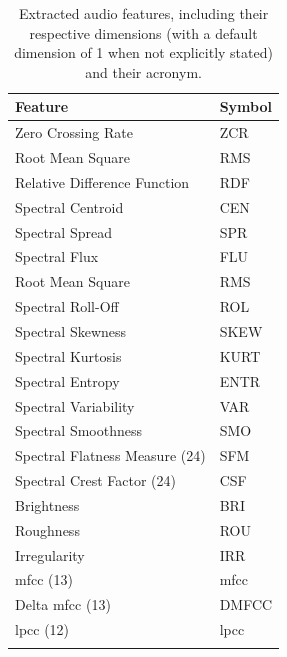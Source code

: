 \begin{table}[ht!]
    \caption[Features extracted in the BDLib2 dataset]{Extracted audio features, including their respective dimensions (with a default dimension of 1 when not explicitly stated) and their acronym.}
    \label{table:BDLib2_features_extracted}
    \centering
    \begin{tabular}{
        >{\centering\arraybackslash}m{} | >{\centering\arraybackslash}m{}}
        \Xhline{2\arrayrulewidth}
        \rowcolor{lightgray}
        \textbf{Feature} & \textbf{Symbol} \\
        \hline
        Zero Crossing Rate & ZCR \\
        \hline
        Root Mean Square & RMS \\
        \hline
        Relative Difference Function & RDF  \\
        \hline
        Spectral Centroid  & CEN \\
        \hline
        Spectral Spread & SPR\\
        \hline
        Spectral Flux & FLU \\
        \hline
        Root Mean Square & RMS \\
        \hline
        Spectral Roll-Off & ROL \\
        \hline
        Spectral Skewness & SKEW \\
        \hline
        Spectral Kurtosis & KURT \\
        \hline
        Spectral Entropy & ENTR \\
        \hline
        Spectral Variability & VAR \\
        \hline
        Spectral Smoothness & SMO \\
        \hline
        Spectral Flatness Measure (24) & SFM \\
        \hline
        Spectral Crest Factor (24) & CSF \\
        \hline
        Brightness  & BRI \\
        \hline
        Roughness & ROU \\
        \hline
        Irregularity & IRR \\
        \hline
        \gls{mfcc} (13) & \gls{mfcc} \\
        \hline
        Delta \gls{mfcc} (13) & DMFCC \\
        \hline
        \gls{lpcc} (12) & \gls{lpcc} \\
        \Xhline{2\arrayrulewidth}
    \end{tabular}
\end{table}

